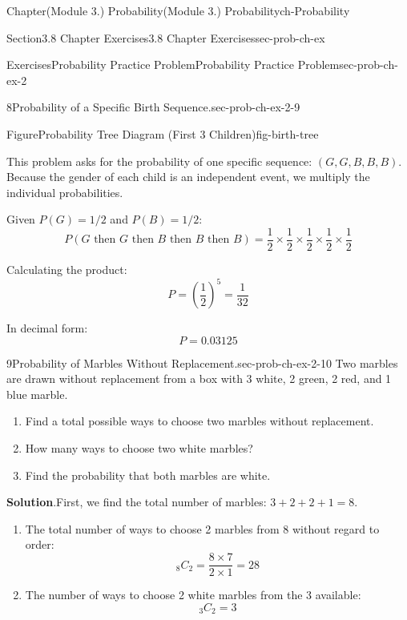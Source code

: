 \documentclass[oneside,10pt,]{book}
\newcommand{\blocktitlefont}{\relax}
\begin{document}
\begin{chapterptx}{Chapter}{(Module 3.) Probability}{}{(Module 3.) Probability}{}{}{ch-Probability}
\begin{sectionptx}{Section}{3.8 Chapter Exercises}{}{3.8 Chapter Exercises}{}{}{sec-prob-ch-ex}
\begin{exercises-subsection-numberless}{Exercises}{Probability Practice Problem}{}{Probability Practice Problem}{}{}{sec-prob-ch-ex-2}
\begin{divisionexercise}{8}{Probability of a Specific Birth Sequence.}{}{sec-prob-ch-ex-2-9}
\begin{figureptx}{Figure}{Probability Tree Diagram (First 3 Children)}{fig-birth-tree}{}
\tcblower
\end{figureptx}%
This problem asks for the probability of one specific sequence: \((G, G, B, B, B)\). Because the gender of each child is an independent event, we multiply the individual probabilities.%
\par
Given \(P(G) = 1/2\) and \(P(B) = 1/2\):%
\begin{equation*}
P(G \text{ then } G \text{ then } B \text{ then } B \text{ then } B) = \frac{1}{2} \times \frac{1}{2} \times \frac{1}{2} \times \frac{1}{2} \times \frac{1}{2}
\end{equation*}
%
\par
Calculating the product:%
\begin{equation*}
P = \left(\frac{1}{2}\right)^5 = \frac{1}{32}
\end{equation*}
%
\par
In decimal form:%
\begin{equation*}
P = 0.03125
\end{equation*}
%
\end{divisionexercise}%
\begin{divisionexercise}{9}{Probability of Marbles Without Replacement.}{}{sec-prob-ch-ex-2-10}%
Two marbles are drawn without replacement from a box with 3 white, 2 green, 2 red, and 1 blue marble.%
\begin{enumerate}[label={\alph*}]
\item{}Find a total possible ways to choose two marbles without replacement.%
\item{}How many ways to choose two white marbles?%
\item{}Find the probability that both marbles are white.%
\end{enumerate}
%
\par\smallskip%
\noindent\textbf{\blocktitlefont Solution}.\hypertarget{sec-prob-ch-ex-2-10-3}{}\quad{}First, we find the total number of marbles: \(3 + 2 + 2 + 1 = 8\).%
\par
%
\begin{enumerate}[label={\alph*}]
\item{}The total number of ways to choose 2 marbles from 8 without regard to order:%
\begin{equation*}
{}_{8}C_{2} = \frac{8 \times 7}{2 \times 1} = 28
\end{equation*}
%
\item{}The number of ways to choose 2 white marbles from the 3 available:%
\begin{equation*}
{}_{3}C_{2} = 3
\end{equation*}

\end{enumerate}
\end{divisionexercise}
\end{exercises-subsection-numberless}
\end{sectionptx}
\end{chapterptx}
\end{document}
